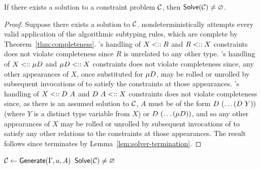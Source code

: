 \documentclass[runningheads]{llncs}
\begin{document}
\begin{lemma}
  \label{lem:solver-completeness}
  If there exists a solution to a constraint problem $\mathcal{C}$, then $\textsf{Solve}(\mathcal{C}) \neq \varnothing$.
\end{lemma}
\begin{proof}
  Suppose there exists a solution to $\mathcal{C}$.
   nondeterministically attempts every valid application of the algorithmic subtyping rules, which are complete by Theorem~\ref{thm:completeness}.
  's handling of $X \mathrel{<::} R$ and $R \mathrel{<::} X$ constraints does not violate completeness since $R$ is unrelated to any other type.
  's handling of $X \mathrel{<::} \mu D$ and $\mu D \mathrel{<::} X$ constraints does not violate completeness since, any other appearances of $X$, once substituted for $\mu D$, may be rolled or unrolled by subsequent invocations of  to satisfy the constraints at those appearances.
  's handling of $X \mathrel{<::} D ~ A$ and $D ~ A \mathrel{<::} X$ constraints does not violate completeness since, as there is an assumed solution to $\mathcal{C}$, $A$ must be of the form $D ~ (\dots (D ~ Y))$ (where $Y$ is a distinct type variable from $X$) or $D ~ (\dots (\mu D))$, and so any other appearances of $X$ may be rolled or unrolled by subsequent invocations of  to satisfy any other relations to the constraints at those appearances.
  The result follows since  terminates by Lemma~\ref{lem:solver-termination}.
\end{proof}

\begin{algorithm}[tb]
  \caption{Type checking for \lcataSub.}
  \label{alg:type-checker}
  \begin{algorithmic}[1]
    \State $\mathcal{C} \gets \textsf{Generate}(\Gamma, a, A)$
    \State \Return $\textsf{Solve}(\mathcal{C}) \neq \varnothing$
    \EndFunction
  \end{algorithmic}
\end{algorithm}
\end{document}
